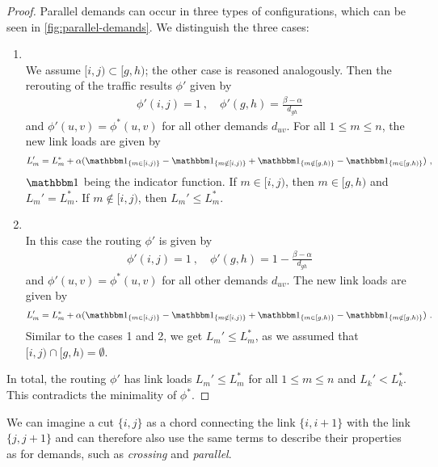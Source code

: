 \begin{proof}
	Parallel demands can occur in three types of configurations, which can be seen in \cref{fig:parallel-demands}.
	We distinguish the three cases:
	\begin{enumerate}[align=left]
		\item[\textbf{Cases 1 and 2:} $[i, j) \subset [g, h)$ or $[g, h) \subset [i,j)$]{\mbox{}\\
			We assume $[i, j) \subset [g, h)$; the other case is reasoned analogously.
			Then the rerouting of the traffic results $\phi'$ given by
			\begin{align}
				\phi'(i, j) = 1 \ ,\quad
				\phi'(g, h) = \frac{\beta - \alpha}{d_{gh}}
			\end{align}
			and $\phi'(u, v) = \phi^\ast(u, v)$ for all other demands $d_{uv}$.
			For all $1 \leq m \leq n$, the new link loads are given by
			\begin{equation}
				L_m' = L_m^\ast + \alpha (\dOne_{\{m \in [i, j)\}} - \dOne_{\{m \notin [i, j)\}} + 
				\dOne_{\{m \notin [g, h)\}} - \dOne_{\{m \in [g, h)\}}) \ ,
			\end{equation}
			$\dOne$ being the indicator function.
			If $m \in [i, j)$, then $m \in [g, h)$ and $L_m' = L_m^\ast$.
			If $m \notin [i, j)$, then  $L_m' \leq L_m^\ast$.
		}
		\item[\textbf{Case 3:} $[i, j) \cap [g, h) = \emptyset$]{\mbox{}\\
			In this case the routing $\phi'$ is given by
			\begin{align}
				\phi'(i, j) = 1 \ ,\quad
				\phi'(g, h) = 1 - \frac{\beta - \alpha}{d_{gh}}
			\end{align}
			and $\phi'(u, v) = \phi^\ast(u, v)$ for all other demands $d_{uv}$.
			The new link loads are given by
			\begin{equation}
				L_m' = L_m^\ast + \alpha (\dOne_{\{m \in [i, j)\}} - \dOne_{\{m \notin [i, j)\}} + 
				\dOne_{\{m \in [g, h)\}} - \dOne_{\{m \notin [g, h)\}}) \ .
			\end{equation}
			Similar to the cases 1 and 2, we get $L_m' \leq L_m^\ast$, as we assumed that $[i, j) \cap [g, h) = \emptyset$.
		}
	\end{enumerate}
	In total, the routing $\phi'$ has link loads $L_m' \leq L_m^\ast$ for all $1 \leq m \leq n$ and $L_k' < L_k^\ast$.
	This contradicts the minimality of $\phi^\ast$.
\end{proof}

We can imagine a cut $\{i, j\}$ as a chord connecting the link $\{i, i+1\}$ with the link $\{j, j+1\}$ and can therefore also use the same terms to describe their properties as for demands, such as \emph{crossing} and \emph{parallel}.

